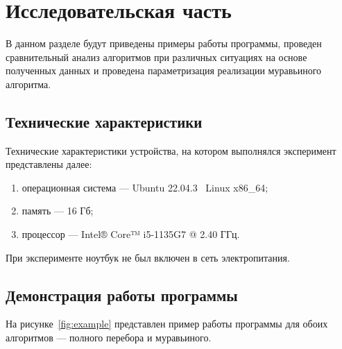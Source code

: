 \chapter{Исследовательская часть}

В данном разделе будут приведены примеры работы программы, проведен сравнительный анализ алгоритмов при различных ситуациях на основе полученных данных и проведена параметризация реализации муравьиного алгоритма.

\section{Технические характеристики}

Технические характеристики устройства, на котором выполнялся эксперимент представлены далее:

\begin{enumerate}[label=\arabic*)]
	\item операционная система --- Ubuntu 22.04.3~\cite{ubuntu} Linux x86\_64;
	\item память --- 16 Гб;
	\item процессор --- Intel® Core™ i5-1135G7 @ 2.40 ГГц.
\end{enumerate}

При эксперименте ноутбук не был включен в сеть электропитания.

\section{Демонстрация работы программы}

На рисунке~\ref{fig:example} представлен пример работы программы для обоих алгоритмов --- полного перебора и муравьиного.

